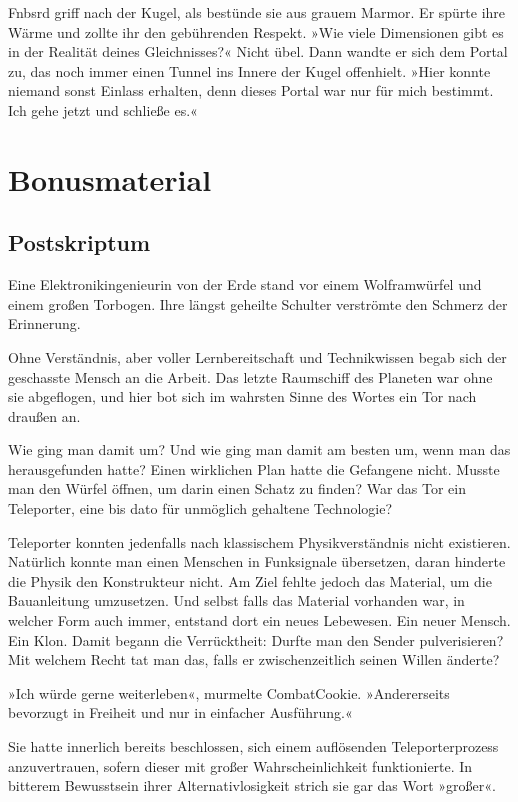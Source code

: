 Fnbsrd griff nach der Kugel, als bestünde sie aus grauem Marmor. Er spürte ihre Wärme und zollte ihr den gebührenden Respekt. »Wie viele Dimensionen gibt es in der Realität deines Gleichnisses?« Nicht übel. Dann wandte er sich dem Portal zu, das noch immer einen Tunnel ins Innere der Kugel offenhielt. »Hier konnte niemand sonst Einlass erhalten, denn dieses Portal war nur für mich bestimmt. Ich gehe jetzt und schließe es.«


\part{Bonusmaterial}

\chapter{Postskriptum}

Eine Elektronikingenieurin von der Erde stand vor einem Wolframwürfel und einem großen Torbogen. Ihre längst geheilte Schulter verströmte den Schmerz der Erinnerung.

Ohne Verständnis, aber voller Lernbereitschaft und Technikwissen begab sich der geschasste Mensch an die Arbeit. Das letzte Raumschiff des Planeten war ohne sie abgeflogen, und hier bot sich im wahrsten Sinne des Wortes ein Tor nach draußen an.

Wie ging man damit um? Und wie ging man damit am besten um, wenn man das herausgefunden hatte? Einen wirklichen Plan hatte die Gefangene nicht. Musste man den Würfel öffnen, um darin einen Schatz zu finden? War das Tor ein Teleporter, eine bis dato für unmöglich gehaltene Technologie?

Teleporter konnten jedenfalls nach klassischem Physikverständnis nicht existieren. Natürlich konnte man einen Menschen in Funksignale übersetzen, daran hinderte die Physik den Konstrukteur nicht. Am Ziel fehlte jedoch das Material, um die Bauanleitung umzusetzen. Und selbst falls das Material vorhanden war, in welcher Form auch immer, entstand dort ein neues Lebewesen. Ein neuer Mensch. Ein Klon. Damit begann die Verrücktheit: Durfte man den Sender pulverisieren? Mit welchem Recht tat man das, falls er zwischenzeitlich seinen Willen änderte?

»Ich würde gerne weiterleben«, murmelte CombatCookie. »Andererseits bevorzugt in Freiheit und nur in einfacher Ausführung.«

Sie hatte innerlich bereits beschlossen, sich einem auflösenden Teleporterprozess anzuvertrauen, sofern dieser mit großer Wahrscheinlichkeit funktionierte. In bitterem Bewusstsein ihrer Alternativlosigkeit strich sie gar das Wort »großer«.

